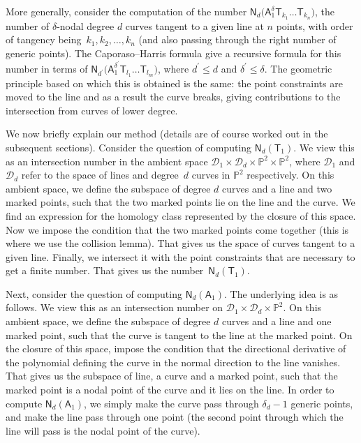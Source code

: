 \documentclass[pdftex]{sigma}
\numberwithin{equation}{section}
\begin{document}
More generally, consider the computation of the number
$\mathsf{N}_d\bigl(\mathsf{A}_1^{\delta}\mathsf{T}_{k_1} \dots \mathsf{T}_{k_n}\bigr)$,
the number of $\delta$-nodal
degree $d$ curves tangent to a given line at $n$ points, with order of tangency being~${k_1, k_2, \dots, k_n}$ (and also passing through the right number of generic points).
The Caporaso--Harris formula give a recursive formula for this number in terms of
$\mathsf{N}_{d^{\prime}}\bigl(\mathsf{A}_1^{\delta^{\prime}}\mathsf{T}_{l_1} \dots \mathsf{T}_{l_m}\bigr)$,
where $d^{\prime} \leq d$ and $\delta^{\prime} \leq \delta$.
The geometric principle based on which
this is obtained is the same: the point constraints are moved to the line and as a result the curve
breaks, giving contributions to the intersection from curves of lower degree.

We now briefly explain our method (details are of course worked out in the subsequent sections).
Consider the question of computing
$\mathsf{N}_d(\mathsf{T}_1)$. We view this as an intersection number in the ambient space
$\mathcal{D}_1 \times \mathcal{D}_d \times \mathbb{P}^2 \times \mathbb{P}^2$,
where $\mathcal{D}_1$ and $\mathcal{D}_d$ refer to the space of lines
and degree~$d$ curves in $\mathbb{P}^2$ respectively.
On this ambient space, we define the subspace of degree $d$ curves and a line and two
marked points, such that the two marked points lie on the line and the curve.
We find an expression for the homology class represented by the closure of
this space. Now we impose the
condition that the two marked points come together (this is where we use the collision lemma).
That gives us the space of curves tangent to a given line. Finally, we intersect it with the
point constraints that are necessary to get a finite number. That gives us the number~$\mathsf{N}_d(\mathsf{T}_1)$.

Next, consider the question of computing
$\mathsf{N}_d(\mathsf{A}_1)$. The underlying idea is as follows. We view this
as an intersection number on
$\mathcal{D}_1 \times \mathcal{D}_d \times \mathbb{P}^2$.
On this ambient space, we define the subspace of degree $d$ curves and a line and one
marked point, such that the curve is tangent to the line at the marked point.
On the closure of this space, impose the condition that the directional
derivative of the polynomial defining the curve in the normal direction to
the line vanishes. That gives us the subspace of line, a curve and a
marked point, such that the marked point is a nodal point of the curve
and it lies on the line. In order to compute
$\mathsf{N}_d(\mathsf{A}_1)$, we simply make the curve pass through $\delta_d-1$
generic points, and make the line pass through one point (the second point through
which the line will pass is the nodal point of the curve).
\end{document}
